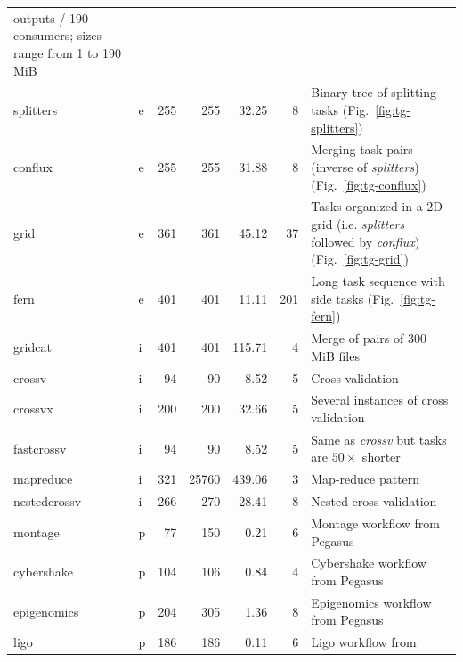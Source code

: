 \begin{table}
\begin{tabular}{l|lrrrr|T}
		outputs / 190 consumers; sizes range from 1 to 190 MiB                           \\
		splitters        & e & 255 & 255   & 32.25  & 8   & Binary tree of
		splitting tasks (Fig.~\ref{fig:tg-splitters})                                    \\
		conflux          & e & 255 & 255   & 31.88  & 8   & Merging task pairs
		(inverse of \emph{splitters}) (Fig.~\ref{fig:tg-conflux})                        \\
		grid             & e & 361 & 361   & 45.12  & 37  & Tasks organized in a 2D grid
		(i.e. \emph{splitters} followed by \emph{conflux}) (Fig.~\ref{fig:tg-grid})
		\\
		fern             & e & 401 & 401   & 11.11  & 201 & Long task sequence with
		side tasks (Fig.~\ref{fig:tg-fern})                                              \\ \hline
		gridcat          & i & 401 & 401   & 115.71 & 4   & Merge of pairs of 300 MiB
		files                                                                            \\
		crossv           & i & 94  & 90    & 8.52   & 5   & Cross validation             \\
		crossvx          & i & 200 & 200   & 32.66  & 5   & Several instances of cross
		validation                                                                       \\
		fastcrossv       & i & 94  & 90    & 8.52   & 5   & Same as \emph{crossv}
		but tasks are $50\times$ shorter                                                 \\
		mapreduce        & i & 321 & 25760 & 439.06 & 3   & Map-reduce pattern           \\
		nestedcrossv     & i & 266 & 270   & 28.41  & 8   & Nested cross
		validation                                                                       \\ \hline
		montage          & p & 77  & 150   & 0.21   & 6   & Montage workflow
		from Pegasus                                                                     \\
		cybershake       & p & 104 & 106   & 0.84   & 4   & Cybershake
		workflow from Pegasus                                                            \\
		epigenomics      & p & 204 & 305   & 1.36   & 8   & Epigenomics
		workflow from Pegasus                                                            \\
		ligo             & p & 186 & 186   & 0.11   & 6   & Ligo workflow from

\end{tabular}
\end{table}
